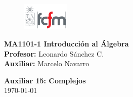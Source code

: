 \documentclass[letterpaper,10pt]{article}
\theoremstyle{plain}
\begin{document}
\newpage
\pagestyle{fancy}
\fancyhf{}

\begin{figure} %
    \vspace{-5mm}
    \includegraphics[width=0.2\textwidth]{img/fcfm2.png}
\end{figure}


\noindent
\textbf{MA1101-1 Introducción al Álgebra}\\
\textbf{Profesor: }Leonardo Sánchez C.\\
\textbf{Auxiliar: }Marcelo Navarro

\begin{center}
{\bf \Large Auxiliar 15: Complejos}\\
{\today}
\end{center}
\end{document}
